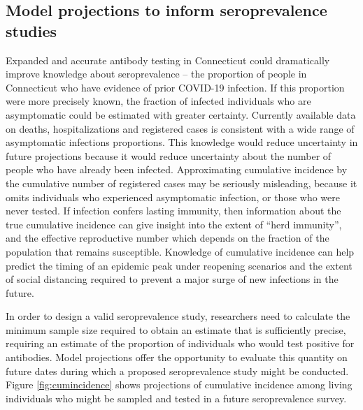 \documentclass[11pt]{article}
\begin{document}
\subsection*{Model projections to inform seroprevalence studies}

Expanded and accurate antibody testing in Connecticut could dramatically improve knowledge about seroprevalence -- the proportion of people in Connecticut who have evidence of prior COVID-19 infection. If this proportion were more precisely known, the fraction of infected individuals who are asymptomatic could be estimated with greater certainty.  Currently available data on deaths, hospitalizations and registered cases is consistent with a wide range of asymptomatic infections proportions.  This knowledge would reduce uncertainty in future projections because it would reduce uncertainty about the number of people who have already been infected.  Approximating cumulative incidence by the cumulative number of registered cases may be seriously misleading, because it omits individuals who experienced asymptomatic infection, or those who were never tested.  If infection confers lasting immunity, then information about the true cumulative incidence can give insight into the extent of ``herd immunity'', and the effective reproductive number which depends on the fraction of the population that remains susceptible. Knowledge of cumulative incidence can help predict the timing of an epidemic peak under reopening scenarios and the extent of social distancing required to prevent a major surge of new infections in the future. 

In order to design a valid seroprevalence study, researchers need to calculate the minimum sample size required to obtain an estimate that is sufficiently precise, requiring an estimate of the proportion of individuals who would test positive for antibodies.  Model projections offer the opportunity to evaluate this quantity on future dates during which a proposed seroprevalence study might be conducted.  Figure \ref{fig:cumincidence} shows projections of cumulative incidence among living individuals who might be sampled and tested in a future seroprevalence survey. 
\end{document}
